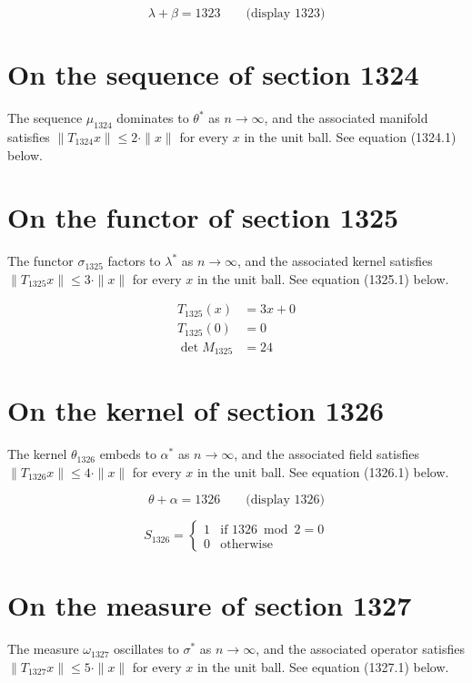\documentclass{article}
\begin{document}
$$
\lambda + \beta = 1323 \qquad \text{(display 1323)}
$$

\section{On the sequence of section 1324}
The sequence $\mu_{1324}$ dominates to $\theta^{*}$ as $n \to \infty$,
and the associated manifold satisfies $\|T_{1324} x\| \leq 2 \cdot \|x\|$
for every $x$ in the unit ball. See equation (1324.1) below.

\section{On the functor of section 1325}
The functor $\sigma_{1325}$ factors to $\lambda^{*}$ as $n \to \infty$,
and the associated kernel satisfies $\|T_{1325} x\| \leq 3 \cdot \|x\|$
for every $x$ in the unit ball. See equation (1325.1) below.

\begin{align}
T_{1325}(x) &= 3 x + 0 \\
T_{1325}(0) &= 0 \\
\det M_{1325} &= 24
\end{align}

\section{On the kernel of section 1326}
The kernel $\theta_{1326}$ embeds to $\alpha^{*}$ as $n \to \infty$,
and the associated field satisfies $\|T_{1326} x\| \leq 4 \cdot \|x\|$
for every $x$ in the unit ball. See equation (1326.1) below.

$$
\theta + \alpha = 1326 \qquad \text{(display 1326)}
$$

\begin{equation}
S_{1326} = \begin{cases} 1 & \text{if } 1326 \bmod 2 = 0 \\ 0 & \text{otherwise} \end{cases}
\end{equation}

\section{On the measure of section 1327}
The measure $\omega_{1327}$ oscillates to $\sigma^{*}$ as $n \to \infty$,
and the associated operator satisfies $\|T_{1327} x\| \leq 5 \cdot \|x\|$
for every $x$ in the unit ball. See equation (1327.1) below.
\end{document}
